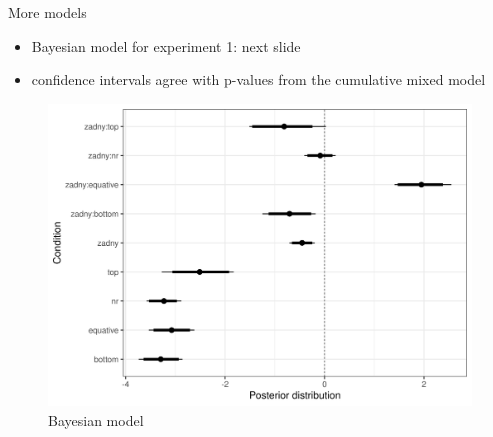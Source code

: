 \documentclass[
  ignorenonframetext,
]{beamer}
\providecommand{\tightlist}{%
  \setlength{\itemsep}{0pt}\setlength{\parskip}{0pt}}
\begin{document}
\begin{frame}
\begin{block}{More models}
\protect\hypertarget{more-models}{}
\begin{itemize}
\tightlist
\item
  Bayesian model for experiment 1: next slide
\item
  confidence intervals agree with p-values from the cumulative mixed
  model
\end{itemize}
\end{block}
\end{frame}

\begin{frame}
\begin{figure}
\centering
\includegraphics{"acc-results-complex.png"}
\caption{Bayesian model}
\end{figure}
\end{frame}
\end{document}
